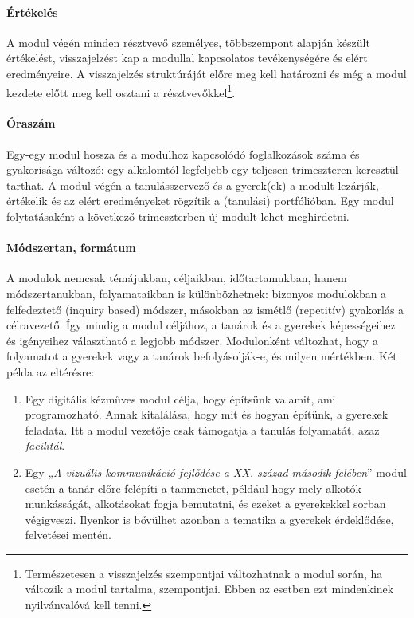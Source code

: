 \paragraph{Értékelés} A modul végén minden résztvevő személyes, többszempont alapján készült értékelést, visszajelzést kap a modullal kapcsolatos tevékenységére és elért eredményeire. A visszajelzés struktúráját előre meg kell határozni és még a modul kezdete előtt meg kell osztani a résztvevőkkel\footnote{Természetesen a visszajelzés szempontjai változhatnak a modul során, ha változik a modul tartalma, szempontjai. Ebben az esetben ezt mindenkinek nyilvánvalóvá kell tenni.}.


\paragraph{Óraszám} Egy-egy modul hossza és a modulhoz kapcsolódó foglalkozások száma és gyakorisága változó: egy alkalomtól legfeljebb egy teljesen trimeszteren keresztül tarthat. A modul végén a tanulásszervező és a gyerek(ek) a modult lezárják, értékelik és az elért eredményeket rögzítik a (tanulási) portfólióban. Egy modul folytatásaként a következő trimeszterben új modult lehet meghirdetni.

\paragraph{Módszertan, formátum} A modulok nemcsak témájukban, céljaikban, időtartamukban, hanem módszertanukban, folyamataikban is különbözhetnek: bizonyos modulokban a felfedeztető (inquiry based) módszer, másokban az ismétlő (repetitív) gyakorlás a célravezető. Így mindig a modul céljához, a tanárok és a gyerekek képességeihez és igényeihez választható a legjobb módszer. Modulonként változhat, hogy a folyamatot a gyerekek vagy a tanárok befolyásolják-e, és milyen mértékben. Két példa az eltérésre:

\begin{enumerate}
      \item Egy digitális kézműves modul célja, hogy építsünk valamit, ami programozható. Annak kitalálása, hogy mit és hogyan építünk, a gyerekek feladata. Itt a modul vezetője csak támogatja a tanulás folyamatát, azaz \emph{facilitál}.

      \item Egy „\emph{A vizuális kommunikáció fejlődése a XX. század második felében}'' modul esetén a tanár előre felépíti a tanmenetet, például hogy mely alkotók munkásságát, alkotásokat fogja bemutatni, és ezeket a gyerekekkel sorban végigveszi. Ilyenkor is bővülhet azonban a tematika a gyerekek érdeklődése, felvetései mentén.

\end{enumerate}



